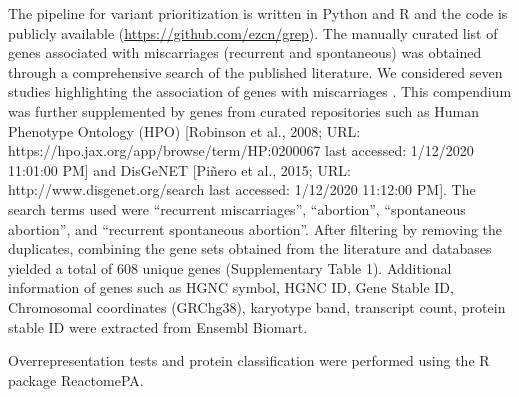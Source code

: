 The \gp pipeline for variant prioritization is written in Python and R and the code is publicly available (\url{https://github.com/ezcn/grep}). The manually curated list of genes associated with miscarriages (recurrent and spontaneous) was obtained through a comprehensive search of the published literature. We considered seven studies highlighting the association of genes with miscarriages \cite{colley2019potential, fu2018whole, laisk2020genetic, pereza2017systematic, qiao2016whole, quintero2017novel, rull2012genetics}. This compendium was further supplemented by genes from curated repositories such as Human Phenotype Ontology (HPO) [Robinson et al., 2008; URL: https://hpo.jax.org/app/browse/term/HP:0200067 last accessed: 1/12/2020 11:01:00 PM] and DisGeNET [Piñero et al., 2015; URL: http://www.disgenet.org/search last accessed: 1/12/2020 11:12:00 PM]. The search terms used were “recurrent miscarriages”, “abortion”, “spontaneous abortion”, and “recurrent spontaneous abortion”. After filtering by removing the duplicates, combining the gene sets obtained from the literature and databases yielded a total of 608 unique genes (Supplementary Table 1). Additional information of genes such as HGNC symbol, HGNC ID, Gene Stable ID, Chromosomal coordinates (GRChg38), karyotype band, transcript count, protein stable ID were extracted from Ensembl Biomart\cite{kinsella2011ensembl}. %

Overrepresentation tests and protein classification were performed using the R package ReactomePA\cite{yu2016reactomepa}.  






